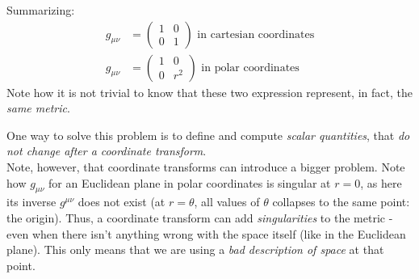 \documentclass[../template.tex]{subfiles}
\begin{document}
\begin{example}
    Summarizing:
    \begin{align*}
        g_{\mu \nu} &= \left(\begin{array}{cc}
        1 & 0 \\ 
        0 & 1
        \end{array}\right) \text{ in cartesian coordinates}\\
        g_{\mu \nu} &= \left(\begin{array}{cc}
        1 & 0 \\ 
        0 & r^2
        \end{array}\right) \text{ in polar coordinates}
    \end{align*}
    Note how it is not trivial to know that these two expression represent, in fact, the \textit{same metric}.    
\end{example}

One way to solve this problem is to define and compute \textit{scalar quantities}, that \textit{do not change after a coordinate transform}.\\

Note, however, that coordinate transforms can introduce a bigger problem. Note how $g_{\mu \nu}$ for an Euclidean plane in polar coordinates is singular at $r=0$, as here its inverse $g^{\mu \nu}$ does not exist (at $r= \theta$, all values of $\theta$ collapses to the same point: the origin). Thus, a coordinate transform can add \textit{singularities} to the metric - even when there isn't anything wrong with the space itself (like in the Euclidean plane). This only means that we are using a \textit{bad description of space} at that point.
\end{document}
